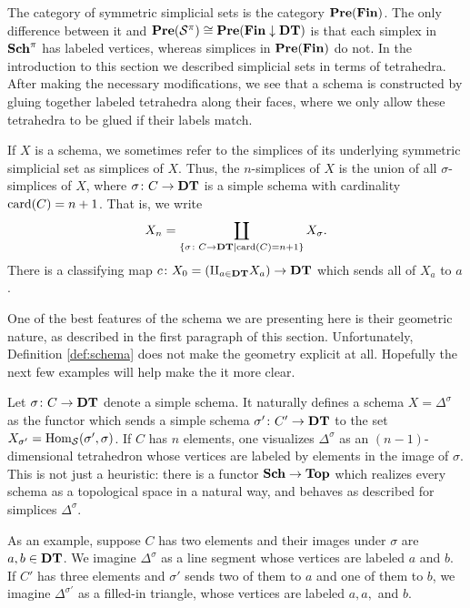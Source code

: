 \documentclass{amsart}
\begin{document}
\begin{remark}\label{rem:symmetric}

The category of symmetric simplicial sets is the category ${\bf Pre}({\bf Fin})$.  The only difference between it and ${\bf Pre}(\mathcal{S}^\pi)\cong{\bf Pre}({\bf Fin}\downarrow{\bf DT})$ is that each simplex in ${\bf Sch}^\pi$ has labeled vertices, whereas simplices in ${\bf Pre}({\bf Fin})$ do not.  In the introduction to this section we described simplicial sets in terms of tetrahedra.  After making the necessary modifications, we see that a schema is constructed by gluing together labeled tetrahedra along their faces, where we only allow these tetrahedra to be glued if their labels match.

If $X$ is a schema, we sometimes refer to the simplices of its underlying symmetric simplicial set as simplices of $X$.  Thus, the $n$-simplices of $X$ is the union of all $\sigma$-simplices of $X$, where $\sigma\colon C\rightarrow{\bf DT}$ is a simple schema with cardinality $\textnormal{card}(C)=n+1$.  That is, we write $$X_n=\coprod_{\{\sigma\colon C\rightarrow{\bf DT}| \textnormal{card}(C)=n+1\}}X_\sigma.$$  There is a classifying map $c\colon X_0=\left(\amalg_{a\in{\bf DT}}X_a\right)\rightarrow{\bf DT}$ which sends all of $X_a$ to $a$.

\end{remark}

One of the best features of the schema we are presenting here is their geometric nature, as described in the first paragraph of this section.  Unfortunately, Definition \ref{def:schema} does not make the geometry explicit at all.  Hopefully the next few examples will help make the it more clear.

\begin{example}\label{ex:simplices}

Let $\sigma\colon C\rightarrow{\bf DT}$ denote a simple schema.  It naturally defines a schema $X=\Delta^\sigma$ as the functor which sends a simple schema $\sigma'\colon C'\rightarrow{\bf DT}$ to the set $X_{\sigma'}=\textnormal{Hom}_\mathcal{S}(\sigma',\sigma)$.  If $C$ has $n$ elements, one visualizes $\Delta^\sigma$ as an $(n-1)$-dimensional tetrahedron whose vertices are labeled by elements in the image of $\sigma$.  This is not just a heuristic: there is a functor ${\bf Sch}\rightarrow{\bf Top}$ which realizes every schema as a topological space in a natural way, and behaves as described for simplices $\Delta^\sigma$.

As an example, suppose $C$ has two elements and their images under $\sigma$ are $a,b\in{\bf DT}$.  We imagine $\Delta^\sigma$ as a line segment whose vertices are labeled $a$ and $b$.  If $C'$ has three elements and $\sigma'$ sends two of them to $a$ and one of them to $b$, we imagine $\Delta^{\sigma'}$ as a filled-in triangle, whose vertices are labeled $a,a,$ and $b$. 

\end{example}
\end{document}
